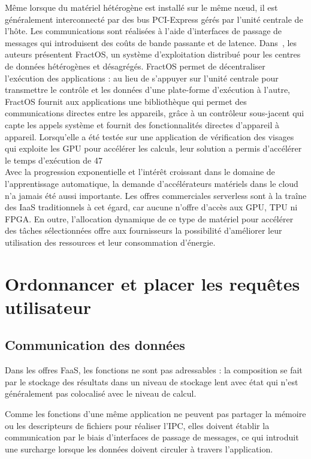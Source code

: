 Même lorsque du matériel hétérogène est installé sur le même nœud, il est généralement interconnecté par des bus PCI-Express gérés par l'unité centrale de l'hôte. Les communications sont réalisées à l'aide d'interfaces de passage de messages qui introduisent des coûts de bande passante et de latence. Dans~\cite{vilanovaSlashingDisaggregationTax2022}, les auteurs présentent FractOS, un système d'exploitation distribué pour les centres de données hétérogènes et désagrégés. FractOS permet de décentraliser l'exécution des applications : au lieu de s'appuyer sur l'unité centrale pour transmettre le contrôle et les données d'une plate-forme d'exécution à l'autre, FractOS fournit aux applications une bibliothèque qui permet des communications directes entre les appareils, grâce à un contrôleur sous-jacent qui capte les appels système et fournit des fonctionnalités directes d'appareil à appareil. Lorsqu'elle a été testée sur une application de vérification des visages qui exploite les GPU pour accélérer les calculs, leur solution a permis d'accélérer le temps d'exécution de 47 %
\\

Avec la progression exponentielle et l'intérêt croissant dans le domaine de l'apprentissage automatique, la demande d'accélérateurs matériels dans le cloud n'a jamais été aussi importante. Les offres commerciales serverless sont à la traîne des IaaS traditionnels à cet égard, car aucune n'offre d'accès aux GPU, TPU ni FPGA. En outre, l'allocation dynamique de ce type de matériel pour accélérer des tâches sélectionnées offre aux fournisseurs la possibilité d'améliorer leur utilisation des ressources et leur consommation d'énergie.

\section{Ordonnancer et placer les requêtes utilisateur}

\subsection{Communication des données} \label{sota-communications}

Dans les offres FaaS, les fonctions ne sont pas adressables : la composition se fait par le stockage des résultats dans un niveau de stockage lent avec état qui n'est généralement pas colocalisé avec le niveau de calcul.

Comme les fonctions d'une même application ne peuvent pas partager la mémoire ou les descripteurs de fichiers pour réaliser l'IPC, elles doivent établir la communication par le biais d'interfaces de passage de messages, ce qui introduit une surcharge lorsque les données doivent circuler à travers l'application.

